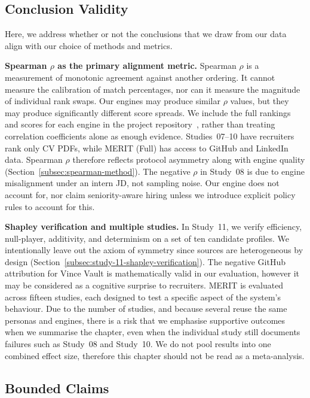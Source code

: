 \subsection{Conclusion Validity}
\label{subsec:conclusion-validity}

Here, we address whether or not the conclusions that we draw from our data align with our choice of methods and metrics.

\textbf{Spearman $\rho$ as the primary alignment metric.}
Spearman $\rho$ is a measurement of monotonic agreement against another ordering. It cannot measure
the calibration of match percentages, nor can it measure the magnitude of individual rank swaps.
Our engines may produce similar $\rho$ values, but they may produce significantly different score spreads.
We include the full rankings and scores for each engine in the project repository~\cite{merit_repo}, rather than
treating correlation coefficients alone as enough evidence. Studies~07--10 have recruiters rank only CV PDFs, 
while MERIT (Full) has access to GitHub and LinkedIn data. Spearman $\rho$ therefore reflects protocol
asymmetry along with engine quality (Section~\ref{subsec:spearman-method}).
The negative $\rho$ in Study~08 is due to engine misalignment under an intern JD, not sampling noise.
Our engine does not account for, nor claim seniority-aware hiring unless we introduce explicit policy rules
to account for this.

\textbf{Shapley verification and multiple studies.}
In Study~11, we verify efficiency, null-player, additivity, and determinism on a set of ten candidate profiles.
We intentionally leave out the axiom of symmetry since sources are heterogeneous by design (Section~\ref{subsec:study-11-shapley-verification}).
The negative GitHub attribution for Vince Vault is mathematically valid in our evaluation, however it
may be considered as a cognitive surprise to recruiters.
MERIT is evaluated across fifteen studies, each designed to test a specific aspect of the system's behaviour.
Due to the number of studies, and because several reuse the same personas and engines, there is a risk that we emphasise
supportive outcomes when we summarise the chapter, even when the individual study still documents failures such as Study~08
and Study~10. We do not pool results into one combined effect size, therefore this chapter should not be read as a meta-analysis.

\subsection{Bounded Claims}
\label{subsec:validity-mitigations}


